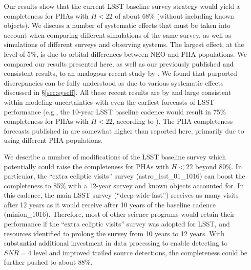 Our results show that the current LSST baseline survey strategy would yield a completeness for PHAs
with $H<22$ of about 68\% (without including known objects). We discuss a number of systematic effects that must be taken into
account when comparing different simulations of the same survey, as well as simulations of different
surveys and observing systems. The largest effect, at the level of 5\%, is due to orbital differences
between NEO and PHA populations. We compared our results presented here, as well as our previously
published and consistent results, to an analogous recent study by \citet[]{GMS2016}. We found that
purported discrepancies can be fully understood as due to various systematic effects discussed in
\S\ref{sec:syseff}. All these recent results are by and large consistent within modeling uncertainties
with even the earliest forecasts of LSST performance (e.g., the 10-year LSST baseline cadence would 
result in 75\% completeness for PHAs with $H<22$, according to \citealt{IvezicNEO2007}). The 
PHA completeness forecasts published in \cite{LSSToverview} are somewhat higher than reported
here, primarily due to using different PHA populations. 

We describe a number of modifications of the LSST baseline survey which potentially could raise the
completeness for PHAs with $H<22$ beyond 80\%. In particular, the ``extra ecliptic visits'' survey
(astro\_lsst\_01\_1016) can boost the completeness to 85\% with a 12-year survey and known objects
accounted for. In this cadence, the main LSST survey (``deep-wide-fast'')
receives as many visits after 12 years as it would receive after 10 years of the
baseline cadence (minion\_1016). Therefore, most of other science programs would
retain their performance if the ``extra ecliptic visits'' survey was adopted for
LSST, and resources identified to prolong the survey from 10 years to 12 years. With substantial additional
investment in data processing to enable detecting to $SNR=4$ level and improved trailed source detections,
the completeness could be further pushed to about 88\%.
